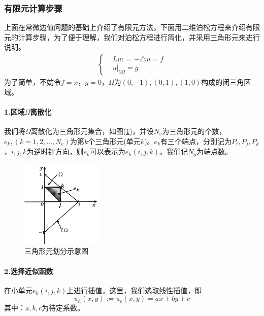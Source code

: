         \subsubsection{有限元计算步骤}
            \label{subsubsec:有限元计算步骤}
            上面在常微边值问题的基础上介绍了有限元方法，下面用二维泊松方程来介绍有限元的计算步骤，为了便于理解，我们对泊松方程进行简化，并采用三角形元来进行说明。
            \begin{align}
                \label{有限元计算步骤示意的原方程}
                \left\{
                \begin{aligned}
                &Lu: = - \triangle u = f\\
                &u \bigl|_{\partial \Omega} = g
                \end{aligned}
                 \right.
            \end{align}
            为了简单，不妨令$f = x$，$g= 0$，$\Omega$为$(0,-1),(0,1),(1,0)$构成的闭三角区域。
            \paragraph{1.区域$\Omega$离散化}
            我们将$\Omega$离散化为三角形元集合，如图(\ref{fig:三角形元划分示意图})，并设$N_e$为三角形元的个数，$e_k,(k = 1,2,\dots,N_e)$为第$k$个三角形元(单元$k$)。$e_k$有三个端点，分别记为$P_i,P_j,P_k$，$i,j,k$为逆时针方向，则$e_k$可以表示为$e_k(i,j,k)$。我们记$N_p$为端点数。\\
            \begin{figure}[H]
            \centering
            \includegraphics[width=4cm]{images/Triangle_element_division.jpg}
            \caption{三角形元划分示意图}
            \label{fig:三角形元划分示意图}
            \end{figure}
            \paragraph{2.选择近似函数}
            在小单元$e_k(i,j,k)$上进行插值，这里，我们选取线性插值，即
            \[
                u_h(x,y) := u_e(x,y) = ax+by+c
            \]
            其中：$a,b,c$为待定系数。

